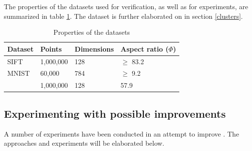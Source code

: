 The properties of the datasets used for verification, as well as for experiments, are summarized in table \ref{tab:datasets}. The \clust{} dataset is further elaborated on in section \ref{clusters}.

\begin{table}[h]
	\centering
	\begin{tabular}{l l l l}
		\hline
		Dataset & Points & Dimensions & Aspect ratio ($\Phi$) \\
		\hline
		SIFT & 1,000,000 & 128 & $\geq$ 83.2 \\
		MNIST & 60,000 & 784 & $\geq$ 9.2 \\
		\clust{} & 1,000,000 & 128 & 57.9 \\
		\hline
	\end{tabular}
	\caption{Properties of the datasets}
	\label{tab:datasets}
\end{table}

\subsection{Experimenting with possible improvements}
A number of experiments have been conducted in an attempt to improve \qs{}. The approaches and experiments will be elaborated below.
